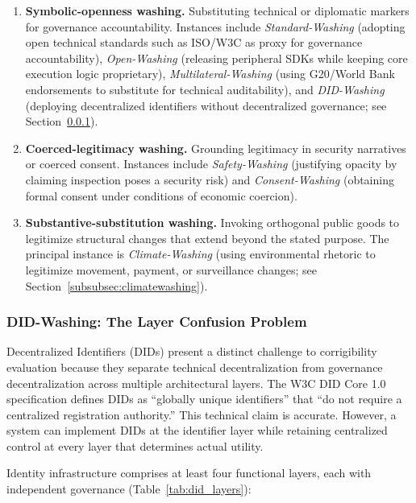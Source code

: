 \documentclass{article}
\begin{document}
\begin{enumerate}
    \item \textbf{Symbolic-openness washing.} Substituting technical or diplomatic markers for governance accountability. Instances include \textit{Standard-Washing} (adopting open technical standards such as ISO/W3C as proxy for governance accountability), \textit{Open-Washing} (releasing peripheral SDKs while keeping core execution logic proprietary), \textit{Multilateral-Washing} (using G20/World Bank endorsements to substitute for technical auditability), and \textit{DID-Washing} (deploying decentralized identifiers without decentralized governance; see Section~\ref{subsubsec:didwashing}).
    \item \textbf{Coerced-legitimacy washing.} Grounding legitimacy in security narratives or coerced consent. Instances include \textit{Safety-Washing} (justifying opacity by claiming inspection poses a security risk) and \textit{Consent-Washing} (obtaining formal consent under conditions of economic coercion).
    \item \textbf{Substantive-substitution washing.} Invoking orthogonal public goods to legitimize structural changes that extend beyond the stated purpose. The principal instance is \textit{Climate-Washing} (using environmental rhetoric to legitimize movement, payment, or surveillance changes; see Section~\ref{subsubsec:climatewashing}).
\end{enumerate}

\subsubsection{DID-Washing: The Layer Confusion Problem}
\label{subsubsec:didwashing}

Decentralized Identifiers (DIDs) present a distinct challenge to corrigibility evaluation because they separate technical decentralization from governance decentralization across multiple architectural layers. The W3C DID Core 1.0 specification \citep{w3cdid2022} defines DIDs as ``globally unique identifiers'' that ``do not require a centralized registration authority.'' This technical claim is accurate. However, a system can implement DIDs at the identifier layer while retaining centralized control at every layer that determines actual utility.

Identity infrastructure comprises at least four functional layers, each with independent governance (Table~\ref{tab:did_layers}):
\end{document}
